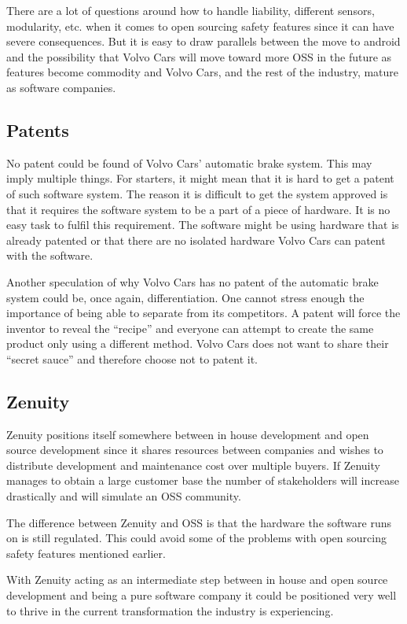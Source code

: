 \documentclass[conference]{IEEEtran}
\begin{document}
There are a lot of questions around how to handle liability, different sensors, modularity, etc. when it comes to open sourcing safety features since it can have severe consequences. But it is easy to draw parallels between the move to android and the possibility that Volvo Cars will move toward more OSS in the future as features become commodity and Volvo Cars, and the rest of the industry, mature as software companies.

\subsection{Patents}
No patent could be found of Volvo Cars' automatic brake system. This may imply multiple things. For starters, it might mean that it is hard to get a patent of such software system. The reason it is difficult to get the system approved is that it requires the software system to be a part of a piece of hardware. It is no easy task to fulfil this requirement. The software might be using hardware that is already patented or that there are no isolated hardware Volvo Cars can patent with the software. 

Another speculation of why Volvo Cars has no patent of the automatic brake system could be, once again, differentiation. One cannot stress enough the importance of being able to separate from its competitors. A patent will force the inventor to reveal the ``recipe'' and everyone can attempt to create the same product only using a different method. Volvo Cars does not want to share their ``secret sauce'' and therefore choose not to patent it. \cite{SoftwarePatent}

\subsection{Zenuity}
Zenuity positions itself somewhere between in house development and open source development since it shares resources between companies and wishes to distribute development and maintenance cost over multiple buyers. If Zenuity manages to obtain a large customer base the number of stakeholders will increase drastically and will simulate an OSS community.

The difference between Zenuity and OSS is that the hardware the software runs on is still regulated. This could avoid some of the problems with open sourcing safety features mentioned earlier.

With Zenuity acting as an intermediate step between in house and open source development and being a pure software company it could be positioned very well to thrive in the current transformation the industry is experiencing.
\end{document}
